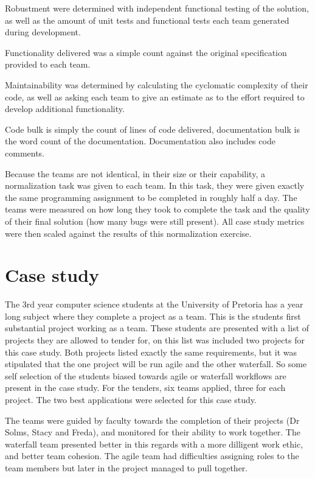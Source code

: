 \documentclass{sig-alternate-05-2015}
\begin{document}
Robustment were determined with independent functional testing of the solution, as well as the amount of unit tests and functional tests each team generated during development. 

Functionality delivered was a simple count against the original specification provided to each team.

Maintainability was determined by calculating the cyclomatic complexity of their code, as well as asking each team to give an estimate as to the effort required to develop additional functionality.

Code bulk is simply the count of lines of code delivered, documentation bulk is the word count of the documentation. Documentation also includes code comments.

Because the teams are not identical, in their size or their capability, a normalization task was given to each team. In this task, they were given exactly the same programming assignment to be completed in roughly half a day. The teams were measured on how long they took to complete the task and the quality of their final solution (how many bugs were still present). All case study metrics were then scaled against the results of this normalization exercise.

\section{Case study}

The 3rd year computer science students at the University of Pretoria has a year long subject where they complete a project as a team. This is the students first substantial project working as a team. These students are presented with a list of projects they are allowed to tender for, on this list was included two projects for this case study. Both projects listed exactly the same requirements, but it was stipulated that the one project will be run agile and the other waterfall. So some self selection of the students biased towards agile or waterfall workflows are present in the case study. For the tenders, six teams applied, three for each project. The two best applications were selected for this case study.

The teams were guided by faculty towards the completion of their projects (Dr Solms, Stacy and Freda), and monitored for their ability to work together. The waterfall team presented better in this regards with a more dilligent work ethic, and better team cohesion. The agile team had difficulties assigning roles to the team members but later in the project managed to pull together.
\end{document}
